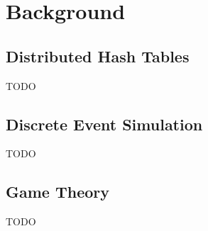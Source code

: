 \chapter{Background}
\section{Distributed Hash Tables}
TODO
\section{Discrete Event Simulation}
TODO
\section{Game Theory}
TODO

